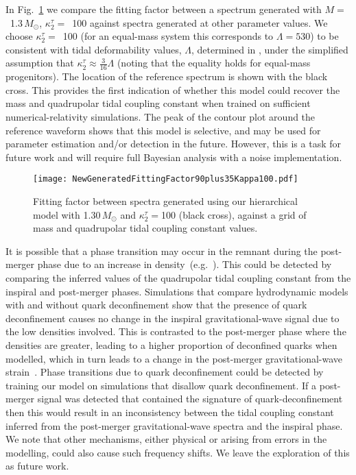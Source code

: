 \documentclass[../Thesis.tex]{subfiles}
\begin{document}
        In Fig.~\ref{fig:GeneratedFittingFactor} we compare the fitting factor between a spectrum generated with $M=$~1.3\,$M_\odot$, $\kappa_2^\tau=$~100 against spectra generated at other parameter values. We choose $\kappa_2^\tau=$~100 (for an equal-mass system this corresponds to $\Lambda=530$) to be consistent with tidal deformability values, $\Lambda$, determined in \cite{GW170817Detection,Annala2018,Radice2018,Most2018,De2018,GW170817Properties}, under the simplified assumption that $\kappa_2^\tau\approx \frac{3}{16}\Lambda$ (noting that the equality holds for equal-mass progenitors). The location of the reference spectrum is shown with the black cross. This provides the first indication of whether this model could recover the mass and quadrupolar tidal coupling constant when trained on sufficient numerical-relativity simulations. The peak of the contour plot around the reference waveform shows that this model is selective, and may be used for parameter estimation and/or detection in the future. However, this is a task for future work and will require full Bayesian analysis with a noise implementation.
 \begin{figure}[H]
 \begin{center}
    \texttt{[image: NewGeneratedFittingFactor90plus35Kappa100.pdf]}
        \caption{Fitting factor between spectra generated using our hierarchical model with 1.30\,$M_{\odot}$ and $\kappa_2^\tau=$100 (black cross), against a grid of mass and quadrupolar tidal coupling constant values.}
        \label{fig:GeneratedFittingFactor}
     
 \end{center}
\end{figure} 
        It is possible that a phase transition may occur in the remnant during the post-merger phase due to an increase in density~(e.g.~\cite{Most2018,Bauswein2018}). This could be detected by comparing the inferred values of the quadrupolar tidal coupling constant from the inspiral and post-merger phases. Simulations that compare hydrodynamic models with and without quark deconfinement show that the presence of quark deconfinement causes no change in the inspiral gravitational-wave signal due to the low densities involved. This is contrasted to the post-merger phase where the densities are greater, leading to a higher proportion of deconfined quarks when modelled, which in turn leads to a change in the post-merger gravitational-wave strain~\cite{Most2018b}. Phase transitions due to quark deconfinement could be detected by training our model on simulations that disallow quark deconfinement. If a post-merger signal was detected that contained the signature of quark-deconfinement then this would result in an inconsistency between the tidal coupling constant inferred from the post-merger gravitational-wave spectra and the inspiral phase. We note that other mechanisms, either physical or arising from errors in the modelling, could also cause such frequency shifts. We leave the exploration of this as future work. \par
\end{document}
